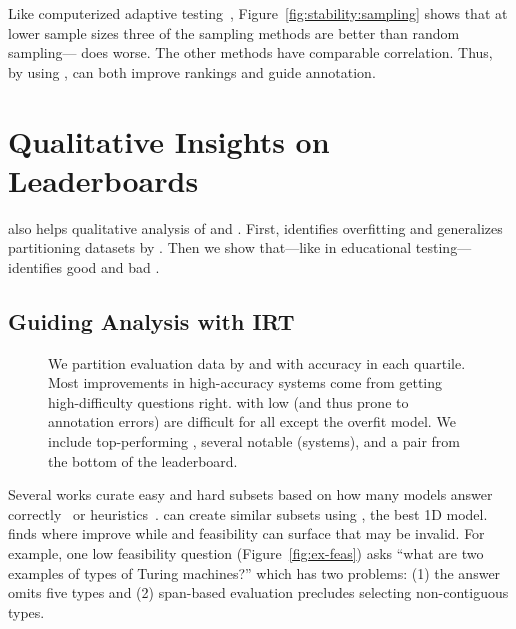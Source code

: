 Like computerized adaptive testing~\citep{moreno1984cat}, Figure~\ref{fig:stability:sampling} shows that at lower sample sizes three of the \irt{} sampling methods are better than random sampling---\diff{} does worse.
The other \irt{} methods have comparable correlation.
Thus, by using \irt{}, \name{} can both improve rankings and guide annotation.
\section{Qualitative Insights on Leaderboards}
\label{ch:isicle:interp}

\name{} also helps qualitative analysis of \itms{} and \subjs{}.
First, \irt{} identifies overfitting and generalizes partitioning datasets by \diff{}.
Then we show that---like in educational testing---\irt{} identifies good and bad \itms{}.

\subsection{Guiding Analysis with IRT}

\begin{figure*}[t]
    \centering
    \caption{
        We partition evaluation data by \irt{} \diff{} and
        \discability{} with accuracy in each quartile.
        Most improvements in high-accuracy systems come from getting
        high-difficulty questions right.
        \Itms{} with low \discability{} (and thus prone to annotation errors) are difficult for all \subjs{} except the overfit  model.
        We include top-performing \squad{} \subjs{}, several notable
        \subjs{} (systems), and a pair from the bottom of the leaderboard.
    }
    \label{fig:confusion}
\end{figure*}

Several works curate easy and hard  subsets based on how many
models answer correctly~\citep{Rondeau2018-um} or
heuristics~\citep{sugawara2018easier}.
\irt{} can create similar subsets using , the best 1D model.
\Diff{} finds where \subjs{} improve while \discability{} and
feasibility can surface \itms{} that may be invalid.
For example, one low feasibility question (Figure~\ref{fig:ex-feas}) asks
``what are two examples of types of Turing machines?'' which has two
problems: (1) the answer omits five types and (2) span-based
evaluation precludes selecting non-contiguous types.

